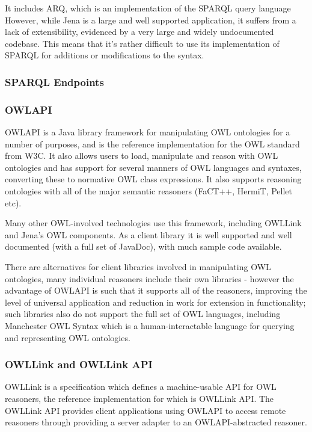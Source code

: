 \documentclass{article}
\begin{document}
It includes ARQ, which is an implementation of the SPARQL query language
However, while Jena is a large and well supported application, it suffers 
from a lack of extensibility, evidenced by a very large and widely undocumented 
codebase. This means that it's rather difficult to use its implementation of
SPARQL for additions or modifications to the syntax.

\subsubsection{SPARQL Endpoints}

\subsubsection{OWLAPI}

OWLAPI is a Java library framework for manipulating OWL ontologies for a number of
purposes, and is the reference implementation for the OWL standard from W3C. 
It also allows users to load, manipulate and reason with OWL ontologies and has 
support for several manners of OWL languages and syntaxes, converting these to 
normative OWL class expressions. It also supports reasoning ontologies with all
of the major semantic reasoners (FaCT++, HermiT, Pellet etc).

Many other OWL-involved technologies use this framework, including OWLLink and Jena's 
OWL components. As a client library it is well supported and well documented
(with a full set of JavaDoc), with much sample code available.

There are alternatives for client libraries involved in manipulating OWL
ontologies, many individual reasoners include their own libraries - however the
advantage of OWLAPI is such that it supports all of the reasoners, improving
the level of universal application and reduction in work for extension in
functionality; such libraries also do not support the full set of OWL languages,
including Manchester OWL Syntax which is a human-interactable language for
querying and representing OWL ontologies.

\subsubsection{OWLLink and OWLLink API}

OWLLink is a specification which defines a machine-usable API for OWL reasoners,
the reference implementation for which is OWLLink API. The OWLLink API provides
client applications using OWLAPI to access remote reasoners through providing a
server adapter to an OWLAPI-abstracted reasoner. 
\end{document}
